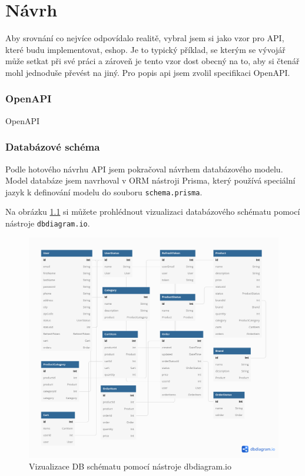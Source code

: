 \documentclass[thesis=M,czech]{FITthesis}[2019/12/23]
\begin{document}
\chapter{Návrh}
Aby srovnání co nejvíce odpovídalo realitě, vybral jsem si jako vzor pro API, které budu implementovat, eshop. Je to typický příklad, se kterým se vývojář může setkat při své práci a zároveň je tento vzor dost obecný na to, aby si čtenář mohl jednoduše převést na jiný. Pro popis api jsem zvolil specifikaci OpenAPI.

\subsection{OpenAPI}
OpenAPI

\subsection*{Databázové schéma}
Podle hotového návrhu API jsem pokračoval návrhem databázového modelu. Model databáze jsem navrhoval v ORM nástroji Prisma, který používá speciální jazyk k definování modelu do souboru \texttt{schema.prisma}.

Na obrázku \ref{schema-dbdiagram} si můžete prohlédnout vizualizaci databázového schématu pomocí nástroje \texttt{dbdiagram.io}.

\begin{figure}[h]
    \includegraphics[width=\linewidth]{img/schema-dbdiagram.png}
    \caption{Vizualizace DB schématu pomocí nástroje dbdiagram.io}
	\label{schema-dbdiagram}
\end{figure}
\end{document}
